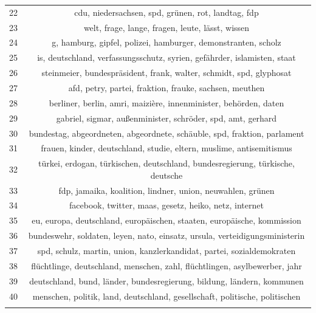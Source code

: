\documentclass[
  12pt,
]{article}
\begin{document}
\begin{table}[!htbp]
\begin{tabular}{@{\extracolsep{5pt}} cc}
22 & cdu, niedersachsen, spd, grünen, rot, landtag, fdp \\ 
23 & welt, frage, lange, fragen, leute, lässt, wissen \\ 
24 & g, hamburg, gipfel, polizei, hamburger, demonstranten, scholz \\ 
25 & is, deutschland, verfassungsschutz, syrien, gefährder, islamisten, staat \\ 
26 & steinmeier, bundespräsident, frank, walter, schmidt, spd, glyphosat \\ 
27 & afd, petry, partei, fraktion, frauke, sachsen, meuthen \\ 
28 & berliner, berlin, amri, maizière, innenminister, behörden, daten \\ 
29 & gabriel, sigmar, außenminister, schröder, spd, amt, gerhard \\ 
30 & bundestag, abgeordneten, abgeordnete, schäuble, spd, fraktion, parlament \\ 
31 & frauen, kinder, deutschland, studie, eltern, muslime, antisemitismus \\ 
32 & türkei, erdogan, türkischen, deutschland, bundesregierung, türkische, deutsche \\ 
33 & fdp, jamaika, koalition, lindner, union, neuwahlen, grünen \\ 
34 & facebook, twitter, maas, gesetz, heiko, netz, internet \\ 
35 & eu, europa, deutschland, europäischen, staaten, europäische, kommission \\ 
36 & bundeswehr, soldaten, leyen, nato, einsatz, ursula, verteidigungsministerin \\ 
37 & spd, schulz, martin, union, kanzlerkandidat, partei, sozialdemokraten \\ 
38 & flüchtlinge, deutschland, menschen, zahl, flüchtlingen, asylbewerber, jahr \\ 
39 & deutschland, bund, länder, bundesregierung, bildung, ländern, kommunen \\ 
40 & menschen, politik, land, deutschland, gesellschaft, politische, politischen \\ 
\hline \\[-1.8ex] 
\end{tabular} 
\end{table}
\end{document}

